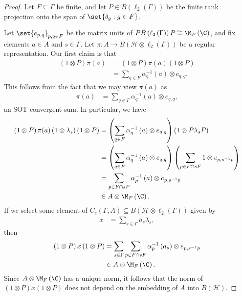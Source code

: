 \documentclass[10pt]{mypackage}
\begin{document}
\begin{proof}
  Let $F\subseteq \Gamma$ be finite, and let $P \in B\left( \ell_2\left( \Gamma \right) \right)$ be the finite rank projection onto the span of $\set{\delta_g : g\in F}$.

  Let $\set{e_{p,q}}_{p,q\in F}$ be the matrix units of $PB\left( \ell_2\left( \Gamma \right) \right)P\cong \M_{F}\left( \C \right)$, and fix elements $a\in A$ and $s\in \Gamma$. Let $\pi\colon A\rightarrow B\left( \mathcal{H}\otimes \ell_2\left( \Gamma \right) \right)$ be a regular representation. Our first claim is that
  \begin{align*}
    \left( 1\otimes P \right) \pi(a) &= \left( 1\otimes P \right)\pi(a)\left( 1\otimes P \right)\\
                                     &= \sum_{q\in F} \alpha_q^{-1}\left( a \right)\otimes e_{q,q}.
  \end{align*}
  This follows from the fact that we may view $\pi(a)$ as
  \begin{align*}
    \pi(a) &= \sum_{q\in \Gamma}\alpha_q^{-1}\left( a \right)\otimes e_{q,q},
  \end{align*}
  an SOT-convergent sum. In particular, we have
  \begin{align*}
    \left( 1\otimes P \right)\pi(a)\left( 1\otimes\lambda_s \right)\left( 1\otimes P \right) &= \left( \sum_{q\in F}\alpha_q^{-1}\left( a \right)\otimes e_{q,q} \right) \left( 1\otimes P\lambda_s P \right)\\
                                                                                             &= \left( \sum_{q\in F}\alpha_q^{-1}\left( a \right)\otimes e_{q,q} \right) \left( \sum_{p\in F\cap sF} 1\otimes e_{p,s^{-1}p} \right)\\
                                                                                             &= \sum_{p\in F\cap sF} \alpha_p^{-1}\left( a \right)\otimes e_{p,s^{-1}p}\\
                                                                                             &\in A\otimes \M_F\left( \C \right).
  \end{align*}
  If we select some element of $C_c\left( \Gamma,A \right)\subseteq B\left( \mathcal{H}\otimes \ell_2\left( \Gamma \right) \right)$ given by
  \begin{align*}
    x &= \sum_{s\in\Gamma} a_s\lambda_s,
  \end{align*}
  then
  \begin{align*}
    \left( 1\otimes P \right)x\left( 1\otimes P \right) &= \sum_{s\in \Gamma}\sum_{p\in F\cap sF} \alpha_p^{-1}\left( a_s \right)\otimes e_{p,s^{-1}p}\\
                                                        &\in A\otimes \M_F\left( \C \right).
  \end{align*}
  Since $A\otimes \M_F\left( \C \right)$ has a unique norm, it follows that the norm of $\left( 1\otimes P \right)x\left( 1\otimes P \right)$ does not depend on the embedding of $A$ into $B\left( \mathcal{H} \right)$.
\end{proof}
\end{document}
